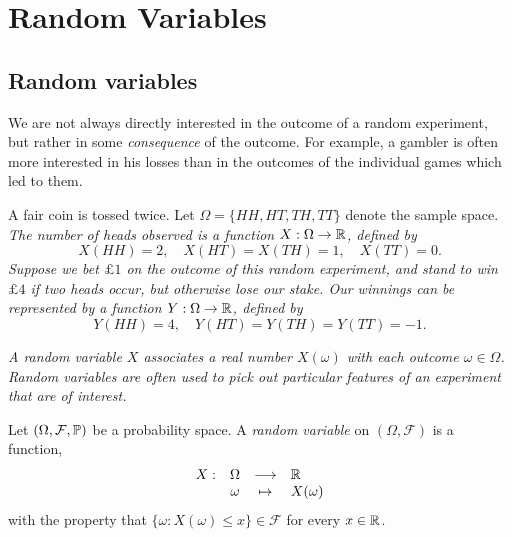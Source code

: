 \chapter{Random Variables}\label{chap:rvs}


\section{Random variables}
We are not always directly interested in the outcome of a random experiment, but rather in some \emph{consequence} of the outcome. For example, a gambler is often more interested in his losses than in the outcomes of the individual games which led to them.

\begin{example}\label{ex:rv1}
A fair coin is tossed twice. Let $\Omega=\{HH,HT,TH,TT\}$ denote the sample space.
\ben
\it The number of heads observed is a function $X:\Omega\to\mathbb{R}$, defined by
\[
X(HH)=2,\quad X(HT) = X(TH) = 1,\quad X(TT)=0.
\]
\it Suppose we bet $\pounds 1$ on the outcome of this random experiment, and stand to win $\pounds 4$ if two heads occur, but otherwise lose our stake. Our winnings can be represented by a function $Y:\Omega\to\mathbb{R}$, defined by 
\[
Y(HH)=4,\quad Y(HT) = Y(TH) = Y(TT) = -1.
\]
\een
\end{example}

\bit
\it A random variable $X$ associates a real number $X(\omega)$ with each outcome $\omega\in\Omega$.
\it Random variables are often used to pick out particular features of an experiment that are of interest.
\eit

\begin{definition}
Let $(\Omega,\mathcal{F},\mathbb{P})$ be a probability space. A \emph{random variable} on $(\Omega,\mathcal{F})$ is a function,
\[
\begin{array}{rccl}
X: 	& \Omega & \longrightarrow 		& \mathbb{R} \\
	& \omega & \mapsto	& X(\omega)
\end{array}
\]	
with the property that $\{\omega:X(\omega)\leq x\} \in \mathcal{F}$ for every $x\in\mathbb{R}$. 
\end{definition}

